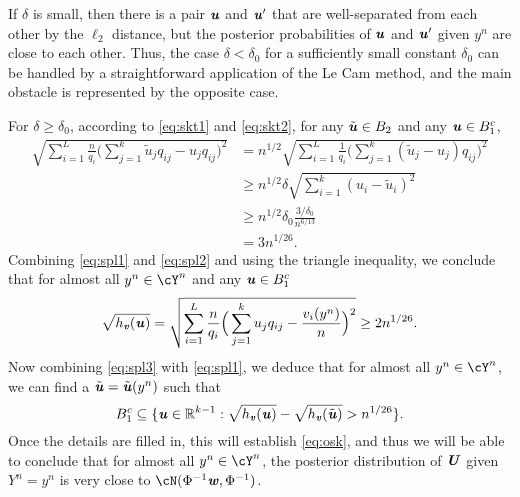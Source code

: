 \documentclass[11pt,onecolumn]{IEEEtran}
\def\mathbi#1{{\textbf{\textit #1}}}
\begin{document}
If $\delta$ is small, then there is a pair $\mathbi{u}$ and $\mathbi{u}'$ that are well-separated from each other 
by the $\ell_2$ distance, but the posterior probabilities of $\mathbi{u}$ and $\mathbi{u}'$ given $y^n$ are close to each other. 
Thus, the case $\delta<\delta_0$ for a sufficiently small constant $\delta_0$ can be handled
by a straightforward application of the Le Cam method, and the main obstacle is represented by the opposite case.

For $\delta\ge \delta_0$, according to \eqref{eq:skt1} and \eqref{eq:skt2}, for any $\tilde{\mathbi{u}} \in B_2$ and any $\mathbi{u}\in B_1^c$,
\begin{equation}\label{eq:spl2}
\begin{aligned}
\sqrt{\sum_{i=1}^L \frac{n}{q_i} \Big(\sum_{j=1}^k \tilde{u}_j q_{ij} - u_j q_{ij} \Big)^2 }
& = n^{1/2} \sqrt{\sum_{i=1}^L \frac{1}{q_i} \Big(\sum_{j=1}^k (\tilde{u}_j - u_j) q_{ij} \Big)^2 } \\
& \ge n^{1/2} \delta \sqrt{\sum_{i=1}^k (u_i - \tilde{u}_i)^2}\\
&\ge n^{1/2} \delta_0 \frac{3/\delta_0}{n^{6/13}}\\
& = 3 n^{1/26}.
\end{aligned}
\end{equation}
Combining \eqref{eq:spl1} and \eqref{eq:spl2} and using the triangle inequality, we conclude that for almost all $y^n\in\cY^n$
and any $\mathbi{u}\in B_1^c$
\begin{equation}\label{eq:spl3}
\sqrt{h_{\mathbi{v}}(\mathbi{u})} =
\sqrt{\sum_{i=1}^L \frac{n}{q_i} \Big(\sum_{j=1}^k u_j q_{ij} - \frac{v_i(y^n)}{n} \Big)^2 }
\ge 2  n^{1/26}.
\end{equation}
Now combining \eqref{eq:spl3} with \eqref{eq:spl1}, we deduce that
for almost all $y^n\in\cY^n$, we can find a $\tilde{\mathbi{u}}=\tilde{\mathbi{u}}(y^n)$ such that
$$
B_1^c \subseteq \{\mathbi{u}\in\mathbb{R}^{k-1}:
\sqrt{h_{\mathbi{v}}(\mathbi{u})} - \sqrt{h_{\mathbi{v}}(\tilde{\mathbi{u}})} > n^{1/26} \}.
$$
Once the details are filled in, this will establish \eqref{eq:osk}, and thus we will be able to conclude that for almost all $y^n\in\cY^n$, the posterior distribution of $\mathbi{U}$ given $Y^n=y^n$ is very close to $\cN(\Phi^{-1}\mathbi{w}, \Phi^{-1})$.
\end{document}
